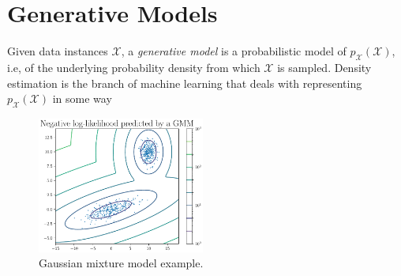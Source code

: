 %
%
%

\chapter{Generative Models}\label{chap:generative_models}
\enlargethispage{2ex}
\vspace*{-2pt}

\enlargethispage{2ex}

Given data instances $\mathcal{X}$, a \textit{generative model} is a probabilistic model of $p_{\mathcal{X}}(\mathcal{X})$, i.e, of the underlying probability density from which $\mathcal{X}$ is sampled. 
Density estimation is the branch of machine learning that deals with representing $p_{\mathcal{X}}(\mathcal{X})$ in some way
%
\begin{figure}[t]
\centering
\includegraphics[page = 1, width=0.49\textwidth]{figures/gmm}
\caption{Gaussian mixture model example.}
\label{fig:gmm}
\end{figure}
%

%
